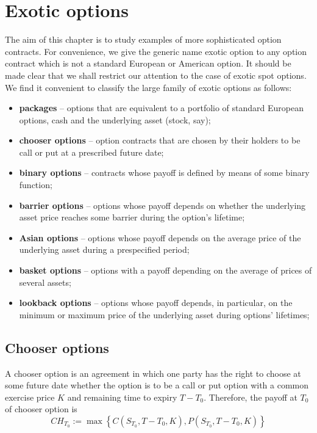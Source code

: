 \documentclass{book}
\begin{document}
\section{Exotic options}
The aim of this chapter is to study examples of more sophisticated option contracts. For convenience, we give the generic name exotic option to any option contract which is not a standard European or American option. It should be made clear that we shall restrict our attention to the case of exotic spot options. We find it convenient to classify the large family of exotic options as follows:
\begin{itemize}
\item \textbf{packages} – options that are equivalent to a portfolio of standard European options, cash and the underlying asset (stock, say);
\item \textbf{chooser options} – option contracts that are chosen by their holders to be call or put at a prescribed future date;
\item \textbf{binary options} – contracts whose payoff is defined by means of some binary function;
\item \textbf{barrier options} – options whose payoff depends on whether the underlying asset price reaches some barrier during the option's lifetime;
\item \textbf{Asian options} – options whose payoff depends on the average price of the underlying asset during a prespecified period;
\item \textbf{basket options} – options with a payoff depending on the average of prices of several assets;
\item \textbf{lookback options} – options whose payoff depends, in particular, on the minimum or maximum price of the underlying asset during options' lifetimes;
\end{itemize}
\subsection{Chooser options}
A chooser option is an agreement in which one party has the right to choose at some future date
whether the option is to be a call or put option with a common exercise price $K$ and remaining 
time to expiry $T-T_{0}$. Therefore, the payoff at $T_{0}$ of chooser option is
$$
CH_{T_{0}}:=\max\left\{C(S_{T_{0}},T-T_{0},K),P(S_{T_{0}},T-T_{0},K)\right\}
$$
\end{document}
